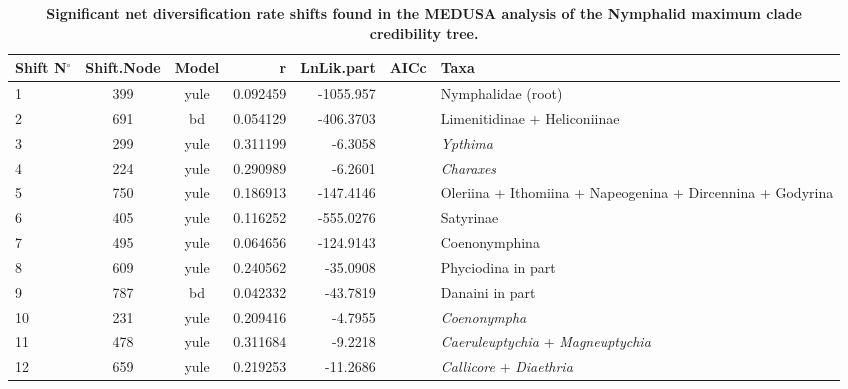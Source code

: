 \documentclass[10pt,letterpaper]{article}
\begin{document}
\begin{table}[!ht]
\begin{adjustwidth}{-2.25in}{0in}
\caption{{\bf Significant net diversification rate shifts found in the MEDUSA analysis of the Nymphalid maximum clade credibility tree.}}
\begin{tabular}{|l|c|c|r|r|c|l|}
\hline
Shift N$^\circ$ & Shift.Node & Model & r          & LnLik.part & AICc     & Taxa                                                       \\ \hline
1               & 399        & yule  & 0.092459   & -1055.957  &          & Nymphalidae (root)                                         \\ \hline
2               & 691        & bd    & 0.054129   & -406.3703  &          & Limenitidinae + Heliconiinae                               \\ \hline
3               & 299        & yule  & 0.311199   & -6.3058    &          & \emph{Ypthima}                                             \\ \hline
4               & 224        & yule  & 0.290989   & -6.2601    &          & \emph{Charaxes}                                            \\ \hline
5               & 750        & yule  & 0.186913   & -147.4146  &          & Oleriina + Ithomiina + Napeogenina + Dircennina + Godyrina \\ \hline
6               & 405        & yule  & 0.116252   & -555.0276  &          & Satyrinae                                                  \\ \hline
7               & 495        & yule  & 0.064656   & -124.9143  &          & Coenonymphina                                              \\ \hline
8               & 609        & yule  & 0.240562   & -35.0908   &          & Phyciodina in part                                         \\ \hline
9               & 787        & bd    & 0.042332   & -43.7819   &          & Danaini in part                                            \\ \hline
10              & 231        & yule  & 0.209416   & -4.7955    &          & \emph{Coenonympha}                                         \\ \hline
11              & 478        & yule  & 0.311684   & -9.2218    &          & \emph{Caeruleuptychia} + \emph{Magneuptychia}              \\ \hline
12              & 659        & yule  & 0.219253   & -11.2686   &          & \emph{Callicore} + \emph{Diaethria}                        \\ \hline

\end{tabular}
\end{adjustwidth}
\end{table}
\end{document}
